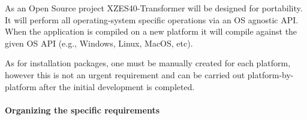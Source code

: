 As an Open Source project XZES40-Transformer will be designed for portability.
It will perform all operating-system specific operations via an OS agnostic API.
When the application is compiled on a new platform it will compile against the given OS API (e.g., Windows, Linux, MacOS, etc).

As for installation packages, one must be manually created for each platform, however this is not an urgent requirement and can be carried out platform-by-platform after the initial development is completed.


\paragraph{Organizing the specific requirements}



